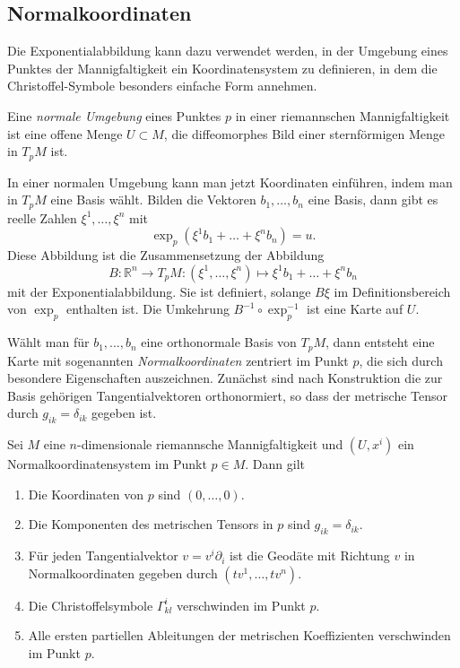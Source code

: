 %
%
\subsection{Normalkoordinaten}
Die Exponentialabbildung kann dazu verwendet werden, in der
Umgebung eines Punktes der Mannigfaltigkeit ein Koordinatensystem
zu definieren, in dem die Christoffel-Symbole besonders einfache
Form annehmen.

\begin{definition}
Eine \emph{normale Umgebung} eines Punktes $p$ in einer 
riemannschen Mannigfaltigkeit ist eine offene Menge $U\subset M$,
die diffeomorphes Bild einer sternförmigen Menge in $T_pM$ ist.
\end{definition}

In einer normalen Umgebung kann man jetzt Koordinaten einführen,
indem man in $T_pM$ eine Basis wählt.
Bilden die Vektoren $b_1,\dots,b_n$ eine Basis, dann gibt es reelle
Zahlen $\xi^1,\dots,\xi^n$ mit 
\[
\exp_p(\xi^1b_1+\dots+\xi^nb_n)=u.
\]
Diese Abbildung ist die Zusammensetzung der 
Abbildung
\[
B
\colon
\mathbb{R}^n \to T_pM
:
(\xi^1,\dots,\xi^n)
\mapsto
\xi^1b_1+\dots+\xi^nb_n
\]
mit der Exponentialabbildung.
Sie ist definiert, solange $B\xi$ im Definitionsbereich von $\exp_p$
enthalten ist.
Die Umkehrung $B^{-1}\circ\exp_p^{-1}$ ist eine Karte auf $U$.

Wählt man für $b_1,\dots,b_n$ eine orthonormale Basis von $T_pM$,
dann entsteht eine Karte mit sogenannten \emph{Normalkoordinaten}
zentriert im Punkt $p$,
die sich durch besondere Eigenschaften auszeichnen.
Zunächst sind nach Konstruktion die zur Basis gehörigen Tangentialvektoren
orthonormiert, so dass der metrische Tensor durch $g_{ik}=\delta_{ik}$
gegeben ist.

\begin{satz}
\label{zusammenhang:geodaeten:satz:normalkoordinaten}
Sei $M$ eine $n$-dimensionale riemannsche Mannigfaltigkeit und $(U,x^i)$
ein Normalkoordinatensystem im Punkt $p\in M$.
Dann gilt
\begin{enumerate}
\item Die Koordinaten von $p$  sind $(0,\dots,0)$.
\item Die Komponenten des metrischen Tensors in $p$ sind $g_{ik}=\delta_{ik}$.
\item Für jeden Tangentialvektor $v=v^i\partial_i$ ist die Geodäte mit
Richtung $v$ in Normalkoordinaten gegeben durch $(tv^1,\dots,tv^n)$.
\item Die Christoffelsymbole $\Gamma^i_{kl}$ verschwinden im Punkt $p$.
\item Alle ersten partiellen Ableitungen der metrischen Koeffizienten
verschwinden im Punkt $p$.
\end{enumerate}
\end{satz}

